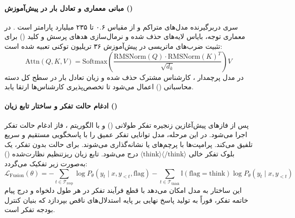 \item {}

\paragraph*{مبانی معماری و تعادل بار در پیش‌آموزش ()}
سری  دربرگیرنده مدل‌های متراکم و  از مقیاس ۰.۶ تا ۲۳۵ میلیارد پارامتر است \cite{qwen2025v3}. در معماری توجه، بایاس لایه‌های  حذف شده و نرمال‌سازی هدهای پرسش و کلید () برای تثبیت ضرب‌های ماتریسی در پیش‌آموزش ۳۶ تریلیون توکنی تعبیه شده است:
\begin{equation}
    \text{Attn}(Q, K, V) = \text{Softmax}\left( \frac{\text{RMSNorm}(Q) \cdot \text{RMSNorm}(K)^T}{\sqrt{d_k}} \right) V
\end{equation}
در مدل پرچمدار ، کارشناس مشترک حذف شده و زیان تعادل بار در سطح کل دسته محاسباتی () \cite{qiu2025demons} اعمال می‌شود تا تخصص‌پذیری کارشناس‌ها ارتقا یابد.

\paragraph*{ادغام حالت تفکر و ساختار تابع زیان ()}
پس از فازهای پیش‌آغازین زنجیره تفکر طولانی () و  با الگوریتم ، فاز ادغام حالت تفکر اجرا می‌شود. در این مرحله، مدل توانایی تفکر عمیق را با پاسخگویی مستقیم و سریع تلفیق می‌کند. پرامپت‌ها با پرچم‌های  یا  نشانه‌گذاری می‌شوند. برای حالت بدون تفکر، یک بلوک تفکر خالی $\langle\text{think}\rangle\langle/\text{think}\rangle$ درج می‌شود. تابع زیان ریزتنظیم نظارت‌شده () به‌صورت زیر تفکیک می‌گردد:
\begin{equation}
    \mathcal{L}_{\text{Fusion}}(\theta) = - \sum_{t \in \mathcal{T}_{\text{resp}}} \log P_\theta(y_t \mid x, y_{<t}, \text{flag}) - \sum_{t \in \mathcal{T}_{\text{think}}} \mathbb{I}(\text{flag} = \text{think}) \log P_\theta(y_t \mid x, y_{<t})
\end{equation}
این ساختار به مدل امکان می‌دهد با قطع فرآیند تفکر در هر طول دلخواه و درج پیام خاتمه تفکر، فوراً به تولید پاسخ نهایی بر پایه استدلال‌های ناقص بپردازد که بنیان کنترل بودجه تفکر است.

